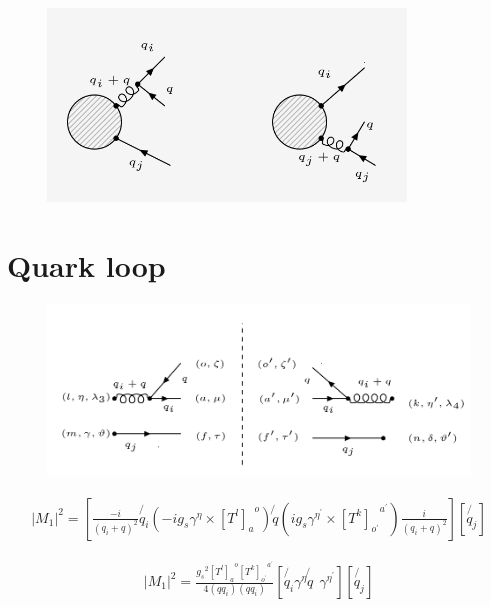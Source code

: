 
\begin{figure}[ht!]
\centering
\includegraphics[width=0.85\textwidth]{images/QG/QGDiagrams.png}
\end{figure}
\pagebreak

\section{Quark loop}
\begin{figure}[ht!]
\centering
\includegraphics[scale=0.7]{images/QG/M1Squer.png}
\end{figure}

\begin{equation}
\begin{split}
|M_1|^2=[\frac{-i}{(q_i +q)^2}\not{q_i}(-ig_s {\gamma}^{\eta}\times{[T^l]_a}^o)\not{q}(ig_s {\gamma}^{{\eta}^{\prime}}\times{[T^k]_{o^{\prime}}}^{a^{\prime}})\frac{i}{(q_i +q)^2}][\not{q_j}]
\end{split}
\end{equation}


\begin{equation}
\begin{split}
|M_1|^2=\frac{{g_s}^2 {[T^l]_a}^o {[T^k]_{o^{\prime}}}^{a^{\prime}}}{4(qq_i)(qq_i)}[\not{q_i}{\gamma}^{\eta}\not{q}\:\: {\gamma}^{{\eta}^{\prime}}][\not{q_j}]
\end{split}
\end{equation}
\pagebreak

